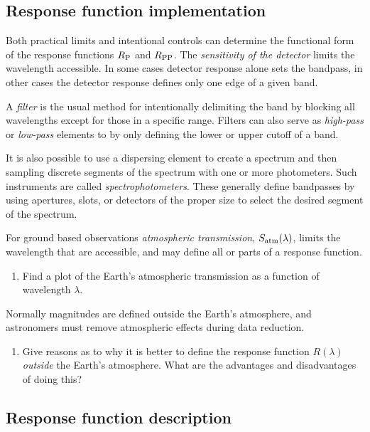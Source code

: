 \subsection{Response function implementation} 
Both practical limits and intentional controls can determine the
functional form of the response functions $R_{\rm P}$ and $R_{\rm
  PP}$. The {\it sensitivity of the detector} limits the wavelength
accessible. In some cases detector response alone sets the bandpass, in
other cases the detector response defines only one edge of a given
band. 

A {\it filter} is the usual method for intentionally delimiting the
band by blocking all wavelengths except for those in a specific
range. Filters can also serve as {\it high-pass} or {\it low-pass}
elements to by only defining the lower or upper cutoff of a band.

It is also possible to use a dispersing element to create a spectrum
and then sampling discrete segments of the spectrum with one or more
photometers. Such instruments are called {\it
  spectrophotometers}. These generally define bandpasses by using
apertures, slots, or detectors of the proper size to select the
desired segment of the spectrum. 

For ground based observations {\it atmospheric transmission}, $S_{\rm
  atm}(\lambda)$, limits the wavelength that are accessible, and may
define all or parts of a response function. 

\begin{enumerate}
\setcounter{enumi}{\value{count}}
\item Find a plot of the Earth's atmospheric transmission as a
  function of wavelength $\lambda$.
\setcounter{count}{\value{enumi}} 
\end{enumerate}

Normally magnitudes are defined outside the Earth's atmosphere, and
astronomers must remove atmospheric effects during data reduction.

\begin{enumerate}
\setcounter{enumi}{\value{count}}
\item Give reasons as to why it is better to define the response
  function $R(\lambda)$ {\it outside} the Earth's atmosphere. What are
  the advantages and disadvantages of doing this?
\setcounter{count}{\value{enumi}} 
\end{enumerate}

\subsection{Response function description}

